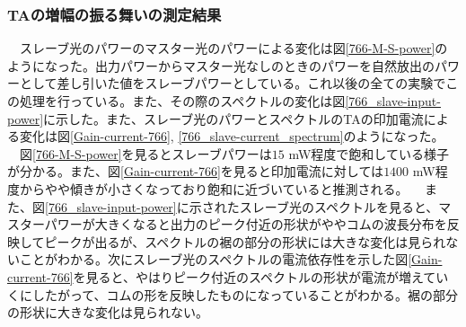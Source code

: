 \documentclass[uplatex, dvipdfmx, a4paper, report, papersize, 11pt]{jsbook}
\begin{document}
\subsubsection{TAの増幅の振る舞いの測定結果}
　スレーブ光のパワーのマスター光のパワーによる変化は図\ref{766-M-S-power}のようになった。出力パワーからマスター光なしのときのパワーを自然放出のパワーとして差し引いた値をスレーブパワーとしている。これ以後の全ての実験でこの処理を行っている。また、その際のスペクトルの変化は図\ref{766_slave-input-power}に示した。また、スレーブ光のパワーとスペクトルのTAの印加電流による変化は図\ref{Gain-current-766}, \ref{766_slave-current_spectrum}のようになった。\\
　図\ref{766-M-S-power}を見るとスレーブパワーは$15$ mW程度で飽和している様子が分かる。また、図\ref{Gain-current-766}を見ると印加電流に対しては$1400$ mW程度からやや傾きが小さくなっており飽和に近づいていると推測される。
　また、図\ref{766_slave-input-power}に示されたスレーブ光のスペクトルを見ると、マスターパワーが大きくなると出力のピーク付近の形状がややコムの波長分布を反映してピークが出るが、スペクトルの裾の部分の形状には大きな変化は見られないことがわかる。次にスレーブ光のスペクトルの電流依存性を示した図\ref{Gain-current-766}を見ると、やはりピーク付近のスペクトルの形状が電流が増えていくにしたがって、コムの形を反映したものになっていることがわかる。裾の部分の形状に大きな変化は見られない。
\newpage
\end{document}
